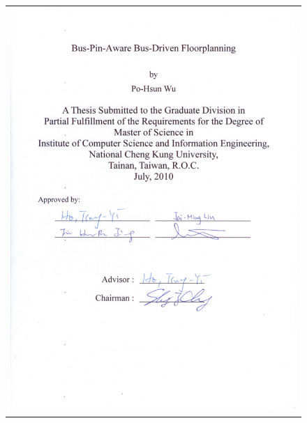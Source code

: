 \begin{figure}[h]
\centering
\vspace{-29mm}
\begin{tabular}{c}
\hspace{-36mm} \includegraphics[]{./oral/oral-eng.pdf}
\end{tabular}
\end{figure}
\newpage
\newpage
